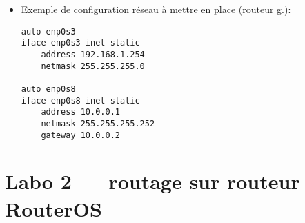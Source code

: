 \documentclass[a4paper]{article}
\begin{document}
\begin{itemize}
\item Exemple de configuration réseau à mettre en place (routeur g.):
\begin{verbatim}
auto enp0s3
iface enp0s3 inet static
    address 192.168.1.254
    netmask 255.255.255.0

auto enp0s8
iface enp0s8 inet static
    address 10.0.0.1
    netmask 255.255.255.252
    gateway 10.0.0.2
\end{verbatim}





\end{itemize}















\newpage \section{Labo 2 --- routage sur routeur RouterOS}
\end{document}
